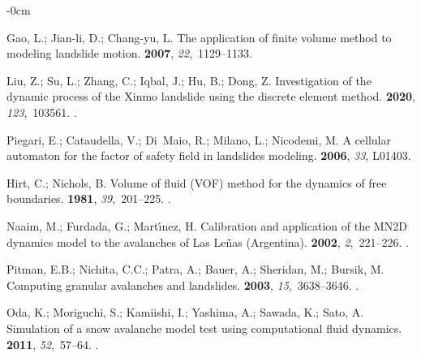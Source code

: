 \documentclass[mathematics,article,accept,pdftex,moreauthors]{Definitions/mdpi}
\begin{document}
\begin{adjustwidth}{-\extralength}{0cm}
\begin{thebibliography}{999}
Gao, L.; Jian-li, D.; Chang-yu, L.
\newblock The application of finite volume method to modeling landslide motion.
 {\bf 2007}, {\em 22},~1129--1133.

Liu, Z.; Su, L.; Zhang, C.; Iqbal, J.; Hu, B.; Dong, Z.
\newblock Investigation of the dynamic process of the Xinmo landslide using the
  discrete element method.
 {\bf 2020}, {\em 123},~103561.
.

Piegari, E.; Cataudella, V.; Di~Maio, R.; Milano, L.; Nicodemi, M.
\newblock A cellular automaton for the factor of safety field in landslides
  modeling.
 {\bf 2006}, {\em 33}, L01403.

Hirt, C.; Nichols, B.
\newblock Volume of fluid ({VOF}) method for the dynamics of free boundaries.
 {\bf 1981}, {\em
  39},~201--225. 
.

Naaim, M.; Furdada, G.; Mart{\'{\i}}nez, H.
\newblock Calibration and application of the {MN}2D dynamics model to the
  avalanches of Las Le{\~{n}}as (Argentina).
 {\bf 2002}, {\em
  2},~221--226.
.

Pitman, E.B.; Nichita, C.C.; Patra, A.; Bauer, A.; Sheridan, M.; Bursik, M.
\newblock Computing granular avalanches and landslides.
 {\bf 2003}, {\em 15},~3638--3646.
.

Oda, K.; Moriguchi, S.; Kamiishi, I.; Yashima, A.; Sawada, K.; Sato, A.
\newblock Simulation of a snow avalanche model test using computational fluid
  dynamics.
 {\bf 2011}, {\em 52},~57--64.
.


\end{thebibliography}
\end{adjustwidth}
\end{document}
